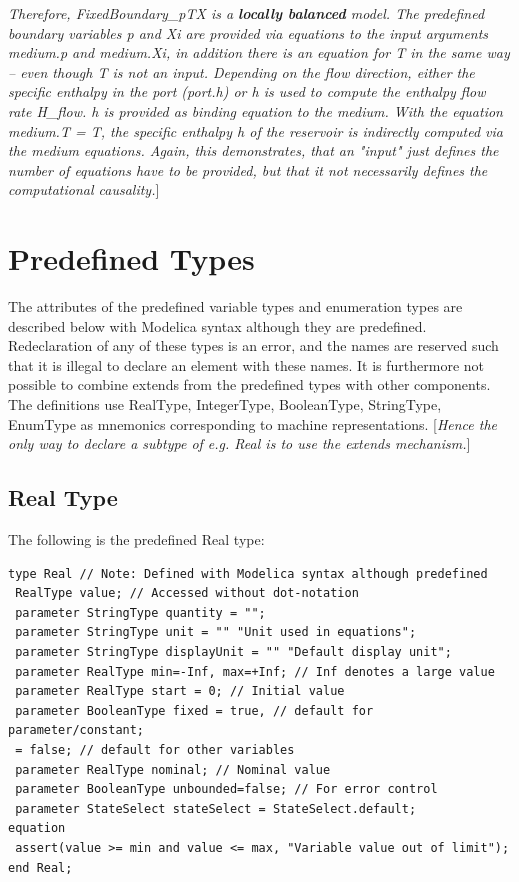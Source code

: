 \documentclass[10pt,a4paper]{report}
\def\Mcomment#1{{[}\emph{#1}{]}}
\def\Mcommentend#1{\emph{#1}{]}}
\def\doublelabel#1{\label{#1}\hypertarget{#1}{}}
\begin{document}
\Mcommentend{Therefore, \emph{FixedBoundary\_pTX} is a \textbf{locally
balanced} model. The predefined boundary variables \emph{p} and \emph{Xi}
are provided via equations to the input arguments \emph{medium.p}
and \emph{medium.Xi}, in addition there is an equation for \emph{T}
in the same way -- even though \emph{T} is not an input. Depending
on the flow direction, either the specific enthalpy in the port
(\emph{port.h}) or \emph{h} is used to compute the enthalpy flow rate
\emph{H\_flow}. \emph{h} is provided as binding equation to the medium. With
the equation \emph{medium.T = T}, the specific enthalpy \emph{h} of the
reservoir is indirectly computed via the medium equations. Again, this
demonstrates, that an "input" just defines the number of equations
have to be provided, but that it not necessarily defines the
computational causality.}

\section{Predefined Types}\doublelabel{predefined-types}

The attributes of the predefined variable types and enumeration types
are described below with Modelica syntax although they are predefined.
Redeclaration of any of these types is an error, and the names are
reserved such that it is illegal to declare an element with these names.
It is furthermore not possible to combine extends from the predefined
types with other components. The definitions use RealType, IntegerType,
BooleanType, StringType, EnumType as mnemonics corresponding to machine
representations. \Mcomment{Hence the only way to declare a subtype of
e.g. \emph{Real} is to use the \emph{extends} mechanism.}

\subsection{Real Type}

The following is the predefined Real type:
\begin{lstlisting}[language=modelica]
type Real // Note: Defined with Modelica syntax although predefined
 RealType value; // Accessed without dot-notation
 parameter StringType quantity = "";
 parameter StringType unit = "" "Unit used in equations";
 parameter StringType displayUnit = "" "Default display unit";
 parameter RealType min=-Inf, max=+Inf; // Inf denotes a large value
 parameter RealType start = 0; // Initial value
 parameter BooleanType fixed = true, // default for parameter/constant;
 = false; // default for other variables
 parameter RealType nominal; // Nominal value
 parameter BooleanType unbounded=false; // For error control
 parameter StateSelect stateSelect = StateSelect.default;
equation
 assert(value >= min and value <= max, "Variable value out of limit");
end Real;
\end{lstlisting}
\end{document}
